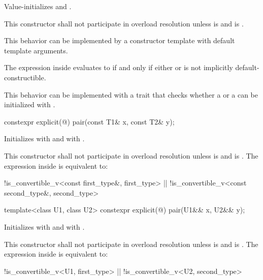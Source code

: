 \begin{itemdescr}
\pnum
\effects
Value-initializes  and .

\pnum
\remarks
This constructor shall not participate in overload resolution unless
 is  and
 is .
\begin{note}
This behavior can be implemented by a constructor template
with default template arguments.
\end{note}
The expression inside  evaluates to 
if and only if either  or
 is not implicitly default-constructible.
\begin{note}
This behavior can be implemented with a trait that checks
whether a  or a 
can be initialized with \tcode{\{\}}.
\end{note}
\end{itemdescr}

%
\begin{itemdecl}
constexpr explicit(@\seebelow@) pair(const T1& x, const T2& y);
\end{itemdecl}

\begin{itemdescr}
\pnum
\effects
Initializes  with  and  with .

\pnum
\remarks
This constructor shall not participate in overload resolution
unless  is  and
 is .
The expression inside  is equivalent to:
\begin{codeblock}
!is_convertible_v<const first_type&, first_type> ||
  !is_convertible_v<const second_type&, second_type>
\end{codeblock}
\end{itemdescr}

%
\begin{itemdecl}
template<class U1, class U2> constexpr explicit(@\seebelow@) pair(U1&& x, U2&& y);
\end{itemdecl}

\begin{itemdescr}
\pnum
\effects
Initializes  with
 and 
with .

\pnum
\remarks
This constructor shall not participate in overload resolution unless
 is  and
 is .
The expression inside  is equivalent to:
\begin{codeblock}
!is_convertible_v<U1, first_type> || !is_convertible_v<U2, second_type>
\end{codeblock}
\end{itemdescr}

